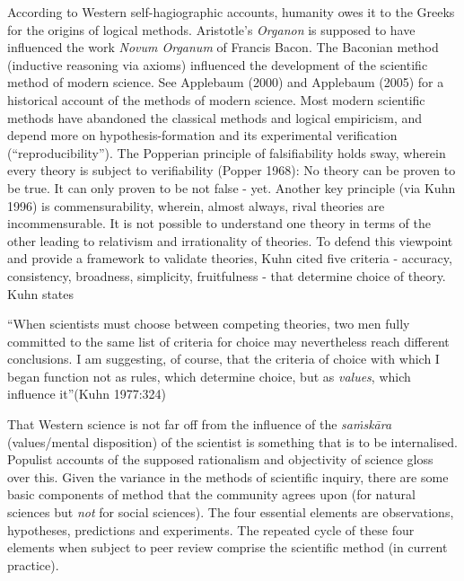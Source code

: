 According to Western self-hagiographic accounts, humanity owes it to the Greeks for the origins of logical methods. Aristotle's {\sl Organon} is supposed to have influenced the work {\sl Novum Organum} of Francis Bacon.  The Baconian method (inductive reasoning via axioms) influenced the development of the scientific method of modern science. See Applebaum (2000) and Applebaum (2005) for a historical account of the methods of modern science. Most modern scientific methods have abandoned the classical methods and logical empiricism, and depend more on hypothesis-formation and its experimental verification (``reproducibility''). The Popperian principle of falsifiability holds sway, wherein every theory is subject to verifiability (Popper 1968): No theory can be proven to be true. It can only proven to be not false - yet.  Another key principle (via Kuhn 1996) is commensurability, wherein, almost always, rival theories are incommensurable. It is not possible to understand one theory in terms of the other leading to relativism and irrationality of theories. To defend this viewpoint and provide a framework to validate theories, Kuhn cited five criteria - accuracy, consistency, broadness, simplicity, fruitfulness - that determine choice of theory. Kuhn states
\begin{myquote}
``When scientists must choose between competing theories, two men fully committed to the same list of criteria for choice may nevertheless reach different conclusions. I am suggesting, of course, that the criteria of choice with which I began function not as rules, which determine choice, but as {\sl values}, which influence it''\hfill (Kuhn 1977:324)
\end{myquote}

That Western science is not far off from the influence of the {{\sl saṁskāra}\relax} (values/mental disposition) of the scientist is something that is to be internalised. Populist accounts of the supposed rationalism and objectivity of science gloss over this. Given the variance in the methods of scientific inquiry, there are some basic components of method that the community agrees upon (for natural sciences but {\sl not} for social sciences). The four essential elements are observations, hypotheses, predictions and experiments. The repeated cycle of these four elements when subject to peer review comprise the scientific method (in current practice).

